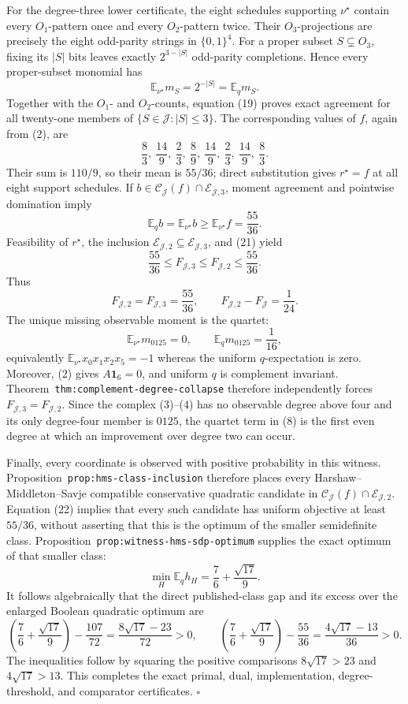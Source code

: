 For the degree-three lower certificate, the eight schedules supporting \(\nu^\star\) contain every \(O_1\)-pattern once and every \(O_2\)-pattern twice.  Their \(O_3\)-projections are precisely the eight odd-parity strings in \(\{0,1\}^4\).  For a proper subset \(S\subsetneq O_3\), fixing its \(|S|\) bits leaves exactly \(2^{3-|S|}\) odd-parity completions.  Hence every proper-subset monomial has
\[
\mathbb E_{\nu^\star}m_S=2^{-|S|}=\mathbb E_qm_S.
\tag{19}
\]
Together with the \(O_1\)- and \(O_2\)-counts, equation (19) proves exact agreement for all twenty-one members of \(\{S\in\mathcal J:|S|\le3\}\).  The corresponding values of \(f\), again from (2), are
\[
\frac83,\ \frac{14}{9},\ \frac23,\ \frac89,
\ \frac{14}{9},\ \frac23,\ \frac{14}{9},\ \frac83.
\tag{20}
\]
Their sum is \(110/9\), so their mean is \(55/36\); direct substitution gives \(r^\star=f\) at all eight support schedules.  If \(b\in\mathcal C_{\mathcal J}(f)\cap\mathcal E_{\mathcal J,3}\), moment agreement and pointwise domination imply
\[
\mathbb E_qb=\mathbb E_{\nu^\star}b
\ge\mathbb E_{\nu^\star}f=\frac{55}{36}.
\tag{21}
\]
Feasibility of \(r^\star\), the inclusion \(\mathcal E_{\mathcal J,2}\subseteq\mathcal E_{\mathcal J,3}\), and (21) yield
\[
\frac{55}{36}\le F_{\mathcal J,3}
\le F_{\mathcal J,2}
\le\frac{55}{36}.
\tag{22}
\]
Thus
\[
F_{\mathcal J,2}=F_{\mathcal J,3}=\frac{55}{36},
\qquad
F_{\mathcal J,2}-F_{\mathcal J}=\frac1{24}.
\tag{23}
\]
The unique missing observable moment is the quartet:
\[
\mathbb E_{\nu^\star}m_{0125}=0,
\qquad
\mathbb E_qm_{0125}=\frac1{16},
\tag{24}
\]
equivalently \(\mathbb E_{\nu^\star}x_0x_1x_2x_5=-1\) whereas the uniform \(q\)-expectation is zero.  Moreover, (2) gives \(A\mathbf 1_6=0\), and uniform \(q\) is complement invariant.  Theorem~\texttt{thm:complement-degree-collapse} therefore independently forces \(F_{\mathcal J,3}=F_{\mathcal J,2}\).  Since the complex (3)--(4) has no observable degree above four and its only degree-four member is \(0125\), the quartet term in (8) is the first even degree at which an improvement over degree two can occur.

Finally, every coordinate is observed with positive probability in this witness.  Proposition~\texttt{prop:hms-class-inclusion} therefore places every Harshaw--Middleton--Savje compatible conservative quadratic candidate in \(\mathcal C_{\mathcal J}(f)\cap\mathcal E_{\mathcal J,2}\).  Equation (22) implies that every such candidate has uniform objective at least \(55/36\), without asserting that this is the optimum of the smaller semidefinite class.  Proposition~\texttt{prop:witness-hms-sdp-optimum} supplies the exact optimum of that smaller class:
\[
\min_H\mathbb E_qh_H
=\frac76+\frac{\sqrt{17}}9.
\tag{25}
\]
It follows algebraically that the direct published-class gap and its excess over the enlarged Boolean quadratic optimum are
\[
\left(\frac76+\frac{\sqrt{17}}9\right)-\frac{107}{72}
=\frac{8\sqrt{17}-23}{72}>0,
\qquad
\left(\frac76+\frac{\sqrt{17}}9\right)-\frac{55}{36}
=\frac{4\sqrt{17}-13}{36}>0.
\tag{26}
\]
The inequalities follow by squaring the positive comparisons \(8\sqrt{17}>23\) and \(4\sqrt{17}>13\).  This completes the exact primal, dual, implementation, degree-threshold, and comparator certificates. \(\square\)

